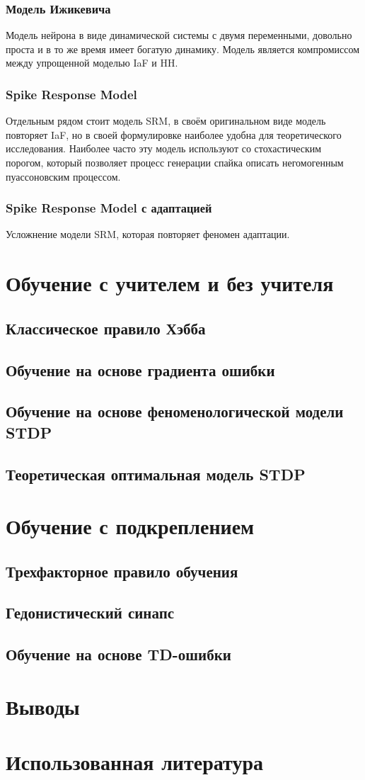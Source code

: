 \documentclass[a4paper,10pt]{article}
\begin{document}
\subsubsection{Модель Ижикевича}
Модель нейрона в виде динамической системы с двумя переменными, довольно проста и в то же время имеет богатую динамику. Модель является компромиссом между упрощенной моделью IaF и HH. 

\subsubsection{Spike Response Model}
Отдельным рядом стоит модель SRM, в своём оригинальном виде модель повторяет IaF, но в своей формулировке наиболее удобна для теоретического исследования. Наиболее часто эту модель используют со   стохастическим порогом, который позволяет процесс генерации спайка описать негомогенным пуассоновским процессом.

\subsubsection{Spike Response Model с адаптацией}
Усложнение модели SRM, которая повторяет феномен адаптации.

\section{Обучение с учителем и без учителя}
\subsection{Классическое правило Хэбба}
\subsection{Обучение на основе градиента ошибки}
\subsection{Обучение на основе феноменологической модели STDP}
\subsection{Теоретическая оптимальная модель STDP}
\section{Обучение с подкреплением}
\subsection{Трехфакторное правило обучения}
\subsection{Гедонистический синапс}
\subsection{Обучение на основе TD-ошибки}
\section{Выводы}
\section{Использованная литература}
{}

\end{document}
